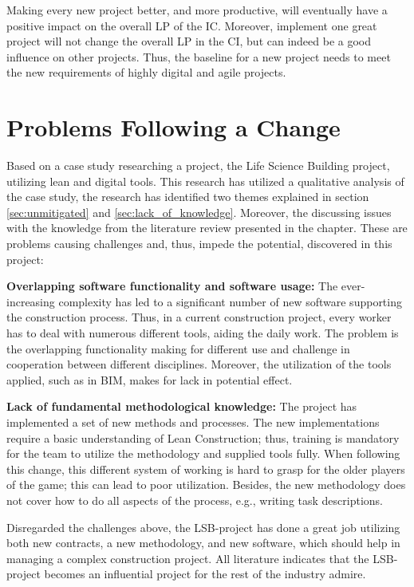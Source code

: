 Making every new project better, and more productive, will eventually have a positive impact on the overall LP of the IC. Moreover, implement one great project will not change the overall LP in the CI, but can indeed be a good influence on other projects. Thus, the baseline for a new project needs to meet the new requirements of highly digital and agile projects.

\section{Problems Following a Change} \label{sec:rq2}
Based on a case study researching a project, the Life Science Building project, utilizing lean and digital tools. This research has utilized a qualitative analysis of the case study, the research has identified two themes explained in section \ref{sec:unmitigated} and \ref{sec:lack_of_knowledge}. Moreover, the discussing issues with the knowledge from the literature review presented in the  chapter. These are problems causing challenges and, thus, impede the potential, discovered in this project:
    
{\bf Overlapping software functionality and software usage:} The ever-increasing complexity has led to a significant number of new software supporting the construction process. Thus, in a current construction project, every worker has to deal with numerous different tools, aiding the daily work. The problem is the overlapping functionality making for different use and challenge in cooperation between different disciplines. Moreover, the utilization of the tools applied, such as in BIM, makes for lack in potential effect.  
    
{\bf Lack of fundamental methodological knowledge:} The project has implemented a set of new methods and processes. The new implementations require a basic understanding of Lean Construction; thus, training is mandatory for the team to utilize the methodology and supplied tools fully. When following this change, this different system of working is hard to grasp for the older players of the game; this can lead to poor utilization. Besides, the new methodology does not cover how to do all aspects of the process, e.g., writing task descriptions.

Disregarded the challenges above, the LSB-project has done a great job utilizing both new contracts, a new methodology, and new software, which should help in managing a complex construction project. All literature indicates that the LSB-project becomes an influential project for the rest of the industry admire. 

